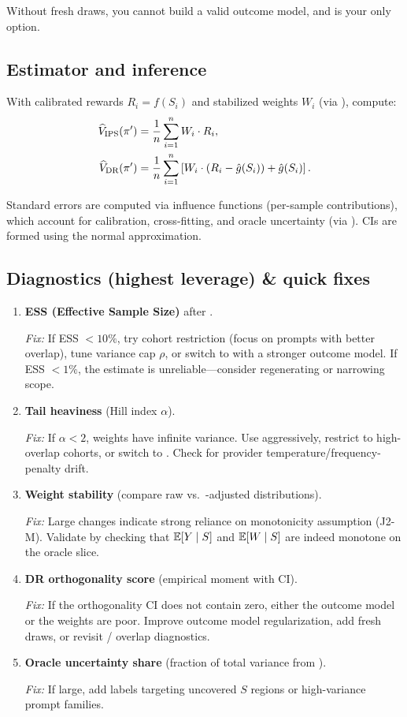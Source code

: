 Without fresh draws, you cannot build a valid outcome model, and \ips{} is your only option.

\subsection{Estimator and inference}

With calibrated rewards $R_i = f(S_i)$ and stabilized weights $W_i$ (via \simcal), compute:
\begin{align}
\widehat{V}_{\text{IPS}}(\pi') &= \frac{1}{n} \sum_{i=1}^n W_i \cdot R_i, \\
\widehat{V}_{\text{DR}}(\pi') &= \frac{1}{n} \sum_{i=1}^n \left[ W_i \cdot (R_i - \hat{g}(S_i)) + \hat{g}(S_i) \right].
\end{align}

Standard errors are computed via influence functions (per-sample contributions), which account for calibration, cross-fitting, and oracle uncertainty (via \oua). CIs are formed using the normal approximation.

\subsection{Diagnostics (highest leverage) \& quick fixes}

\begin{enumerate}[label=(\alph*)]
\item \textbf{ESS (Effective Sample Size)} after \simcal.

\emph{Fix:} If ESS $< 10\%$, try cohort restriction (focus on prompts with better overlap), tune \simcal{} variance cap $\rho$, or switch to \dr{} with a stronger outcome model. If ESS $< 1\%$, the estimate is unreliable---consider regenerating or narrowing scope.

\item \textbf{Tail heaviness} (Hill index $\alpha$).

\emph{Fix:} If $\alpha < 2$, weights have infinite variance. Use \simcal{} aggressively, restrict to high-overlap cohorts, or switch to \dr. Check for provider temperature/frequency-penalty drift.

\item \textbf{Weight stability} (compare raw vs.\ \simcal-adjusted distributions).

\emph{Fix:} Large changes indicate strong reliance on monotonicity assumption (J2-M). Validate by checking that $\operatorname{\mathbb{E}}[Y \mid S]$ and $\operatorname{\mathbb{E}}[W \mid S]$ are indeed monotone on the oracle slice.

\item \textbf{DR orthogonality score} (empirical moment with CI).

\emph{Fix:} If the orthogonality CI does not contain zero, either the outcome model or the weights are poor. Improve outcome model regularization, add fresh draws, or revisit \simcal{} / overlap diagnostics.

\item \textbf{Oracle uncertainty share} (fraction of total variance from \oua).

\emph{Fix:} If large, add labels targeting uncovered $S$ regions or high-variance prompt families.
\end{enumerate}

